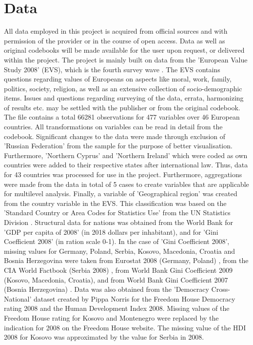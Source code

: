 \documentclass[preprint,12pt,authoryear]{elsarticle}
\begin{document}
\section{Data}
All data employed in this project is acquired from official sources and with permission of the provider or in the course of open access. Data as well as original codebooks will be made available for the user upon request, or delivered within the project.
The project is mainly built on data from the 'European Value Study 2008' (EVS), which is the fourth survey wave \citep{evs_european_2016}. The EVS contains questions regarding values of Europeans on aspects like moral, work, family, politics, society, religion, as well as an extensive collection of socio-demographic items. Issues and questions regarding surveying of the data, errata, harmonizing of results etc. may be settled with the publisher or from the original codebook. The file contains a total 66281 observations for 477 variables over 46 European countries. All transformations on variables can be read in detail from the codebook. Significant changes to the data were made through exclusion of 'Russian Federation' from the sample for the purpose of better visualisation. Furthermore, 'Northern Cyprus' and 'Northern Ireland' which were coded as own countries were added to their respective states after international law. Thus, data for 43 countries was processed for use in the project. Furthermore, aggregations were made from the data in total of 5 cases to create variables that are applicable for multilevel analysis. Finally, a variable of 'Geographical region' was created from the country variable in the EVS. This classification was based on the 'Standard Country or Area Codes for Statistics Use' from the UN Statistics Division \citep{unsd_standard_2019}.
Structural data for nations was obtained from the World Bank for 'GDP per capita of 2008' (in 2018 dollars per inhabitant)\citep{world_bank_gdp_2019}, and for 'Gini Coefficient 2008' (in ration scale 0-1)\citep{world_bank_gini_2019}. In the case of 'Gini Coefficient 2008', missing values for Germany, Poland, Serbia, Kosovo, Macedonia, Croatia and Bosnia Herzegovina were taken from Eurostat 2008 (Germany, Poland) \citep{eurostat_eurostat_2019}, from the CIA World Factbook (Serbia 2008) \citep{central_intelligence_agency_serbia_2019}, from World Bank Gini Coefficient 2009 (Kosovo, Macedonia, Croatia), and from World Bank Gini Coefficient 2007 (Bosnia Herzegovina) \citep{world_bank_gini_2019}. Data was also obtained from the 'Democracy Cross-National' dataset created by Pippa Norris \citep{norris_data_2015} for the Freedom House Democracy rating 2008 and the Human Development Index 2008. Missing values of the Freedom House rating for Kosovo \citep{freedom_house_kosovo_2012} and Montenegro \citep{freedom_house_montenegro_2012} were replaced by the indication for 2008 on the Freedom House website. The missing value of the HDI 2008 for Kosovo was approximated by the value for Serbia in 2008. \\
\end{document}

